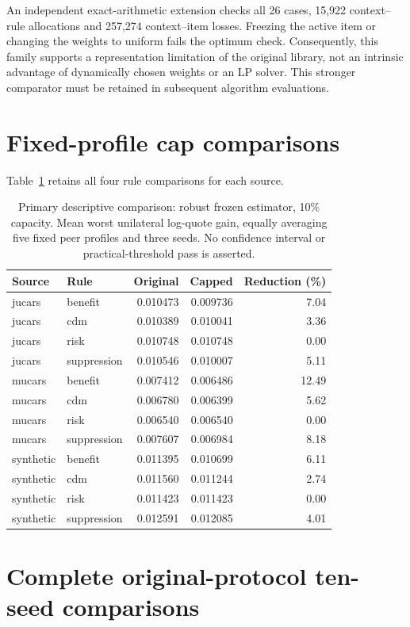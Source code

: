 \documentclass[11pt]{article}
\begin{document}
An independent exact-arithmetic extension checks all 26 cases, 15,922
context--rule allocations and 257,274 context--item losses. Freezing the active
item or changing the weights to uniform fails the optimum check. Consequently,
this family supports a representation limitation of the original library,
not an intrinsic advantage of dynamically chosen weights or an LP solver.
This stronger comparator must be retained in subsequent algorithm evaluations.

\section{Fixed-profile cap comparisons}\label{app:fixed_cap}
Table~\ref{tab:fixed_cap} retains all four rule comparisons for each source.
\begin{table}[ht]
\centering\small
\caption{Primary descriptive comparison: robust frozen estimator, 10\% capacity.
Mean worst unilateral log-quote gain, equally averaging five fixed peer profiles
and three seeds. No confidence interval or practical-threshold pass is asserted.}
\label{tab:fixed_cap}
\begin{tabular}{llrrr}\toprule
Source & Rule & Original & Capped & Reduction (\%)\\\midrule
jucars & benefit & 0.010473 & 0.009736 & 7.04 \\
jucars & cdm & 0.010389 & 0.010041 & 3.36 \\
jucars & risk & 0.010748 & 0.010748 & 0.00 \\
jucars & suppression & 0.010546 & 0.010007 & 5.11 \\
mucars & benefit & 0.007412 & 0.006486 & 12.49 \\
mucars & cdm & 0.006780 & 0.006399 & 5.62 \\
mucars & risk & 0.006540 & 0.006540 & 0.00 \\
mucars & suppression & 0.007607 & 0.006984 & 8.18 \\
synthetic & benefit & 0.011395 & 0.010699 & 6.11 \\
synthetic & cdm & 0.011560 & 0.011244 & 2.74 \\
synthetic & risk & 0.011423 & 0.011423 & 0.00 \\
synthetic & suppression & 0.012591 & 0.012085 & 4.01 \\
\bottomrule\end{tabular}
\end{table}
\section{Complete original-protocol ten-seed comparisons}\label{app:original}
\end{document}
